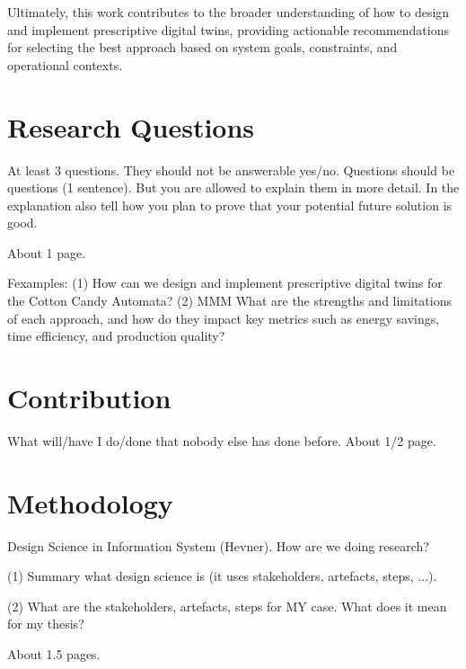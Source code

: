 Ultimately, this work contributes to the broader understanding of how to design and implement prescriptive digital twins, providing actionable recommendations for selecting the best approach based on system goals, constraints, and operational contexts.

\section{Research Questions}
\label{sec:intro:rq}

At least 3 questions. They should not be answerable yes/no. Questions should be
questions (1 sentence). But you are allowed to explain them in more detail. In
the explanation also tell how you plan to prove that your potential future
solution is good.

About 1 page.

Fexamples: 
(1) How can we design and implement prescriptive digital twins for the Cotton Candy Automata?
(2) MMM What are the strengths and limitations of each approach, and how do they impact key metrics such as energy savings, time efficiency, and production quality?

\section{Contribution}
\label{sec:intro:con}

What will/have I do/done that nobody else has done before. About 1/2 page.

\section{Methodology}
\label{sec:intro:meth}



Design Science in Information System (Hevner). How are we doing research?

(1) Summary what design science is (it uses stakeholders, artefacts, steps,
...). 

(2) What are the stakeholders, artefacts, steps for MY case.
What does it mean for my thesis?

About 1.5 pages.


